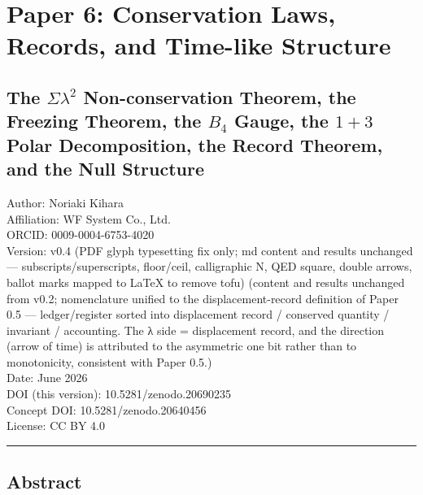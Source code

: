 \documentclass[
]{ltjsarticle}
\author{}
\date{}
\begin{document}
\section{Paper 6: Conservation Laws, Records, and Time-like
Structure}\label{paper-6-conservation-laws-records-and-time-like-structure}

\subsection{\texorpdfstring{The \(\Sigma\lambda^2\) Non-conservation
Theorem, the Freezing Theorem, the \(B_4\) Gauge, the \(1{+}3\) Polar
Decomposition, the Record Theorem, and the Null
Structure}{The \textbackslash Sigma\textbackslash lambda\^{}2 Non-conservation Theorem, the Freezing Theorem, the B\_4 Gauge, the 1\{+\}3 Polar Decomposition, the Record Theorem, and the Null Structure}}\label{the-sigmalambda2-non-conservation-theorem-the-freezing-theorem-the-b_4-gauge-the-13-polar-decomposition-the-record-theorem-and-the-null-structure}

Author: Noriaki Kihara\\
Affiliation: WF System Co., Ltd.\\
ORCID: 0009-0004-6753-4020\\
Version: v0.4 (PDF glyph typesetting fix only; md content and results
unchanged --- subscripts/superscripts, floor/ceil, calligraphic N, QED
square, double arrows, ballot marks mapped to LaTeX to remove tofu)
(content and results unchanged from v0.2; nomenclature unified to the
displacement-record definition of Paper 0.5 --- ledger/register sorted
into displacement record / conserved quantity / invariant / accounting.
The λ side = displacement record, and the direction (arrow of time) is
attributed to the asymmetric one bit rather than to monotonicity,
consistent with Paper 0.5.)\\
Date: June 2026\\
DOI (this version): 10.5281/zenodo.20690235\\
Concept DOI: 10.5281/zenodo.20640456\\
License: CC BY 4.0

\begin{center}\rule{0.5\linewidth}{0.5pt}\end{center}

\subsection{Abstract}\label{abstract}
\end{document}

